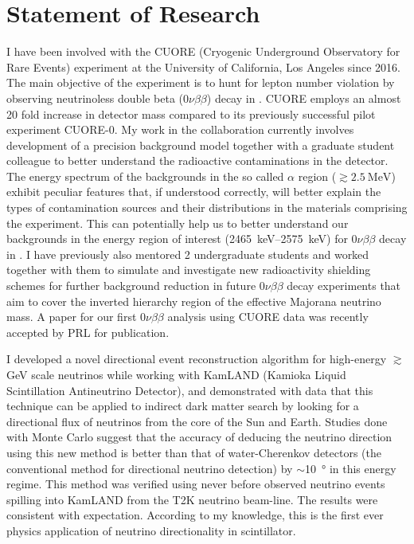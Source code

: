 \documentclass[10pt]{article} %
\begin{document}

\clearpage
\section{Statement of Research}

I have been involved with the CUORE (Cryogenic Underground Observatory for Rare
Events) experiment at the University of California, Los Angeles since 2016. The
main objective of the experiment is to hunt for lepton number violation
by observing neutrinoless double beta ($0\nu\beta\beta$) decay in
. CUORE employs an almost 20 fold increase in detector mass
compared to its previously successful pilot experiment CUORE-0. My work in the
collaboration currently involves development of a precision background model
together with a graduate student colleague to better understand the radioactive
contaminations in the detector. The energy spectrum of the backgrounds in the
so called $\alpha$ region ($\gtrsim \SI{2.5}{\mega\electronvolt}$) exhibit
peculiar features that, if understood correctly, will better explain the types
of contamination sources and their distributions in the materials comprising
the experiment. This can potentially help us to better understand our backgrounds in the energy region of interest
(\SIrange{2465}{2575}{\kilo\electronvolt}) for $0\nu\beta\beta$ decay in
. I have previously also mentored 2 undergraduate students and
worked together with them to simulate and investigate new radioactivity
shielding schemes for further background reduction in future $0\nu\beta\beta$
decay experiments that aim to cover the inverted hierarchy region of the
effective Majorana neutrino mass. A paper for our first $0\nu\beta\beta$
analysis using CUORE data was recently accepted by PRL for publication.

I developed a novel directional event reconstruction algorithm for high-energy
$\gtrsim$\si{\giga\electronvolt} scale neutrinos while working with KamLAND
(Kamioka Liquid Scintillation Antineutrino Detector), and demonstrated with
data that this technique can be applied to indirect dark matter search by
looking for a directional flux of neutrinos from the core of the Sun and Earth.
Studies done with Monte Carlo suggest that the accuracy of deducing the
neutrino direction using this new method is better than that of water-Cherenkov
detectors (the conventional method for directional neutrino detection) by
$\sim$\SI{10}{\degree} in this energy regime. This method was verified using
never before observed neutrino events spilling into KamLAND from the T2K
neutrino beam-line. The results were consistent with expectation. According to
my knowledge, this is the first ever physics application of neutrino
directionality in scintillator.
\end{document}
